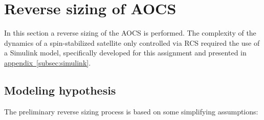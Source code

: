 \section{Reverse sizing of AOCS}
\label{sec:AOCS_sizing}

In this section a reverse sizing of the AOCS is performed. The complexity of the dynamics of a spin-stabilized satellite only controlled via RCS required the use of a Simulink model, specifically developed for this assignment and presented in \hyperref[subsec:simulink]{appendix~\ref*{subsec:simulink}}.

\subsection{Modeling hypothesis}
\label{subsec:mod_hypo}
The preliminary reverse sizing process is based on some simplifying assumptions:

